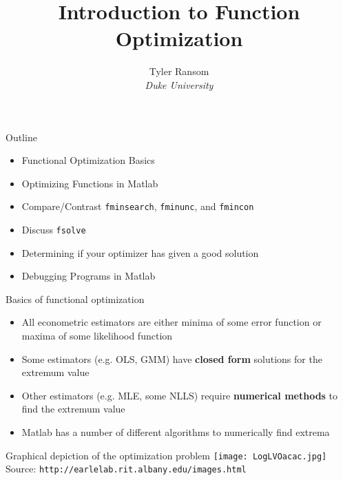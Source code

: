 \documentclass[english,xcolor=dvipsnames]{beamer}
\begin{document}
\begin{frame}
\title{Introduction to Function Optimization}
\author{
	Tyler Ransom\\
	\emph{Duke University}\\
}
\titlepage
\end{frame}

\begin{frame}{Outline}
\begin{itemize}
	\item Functional Optimization Basics
	\item Optimizing Functions in Matlab
	\item Compare/Contrast \texttt{fminsearch}, \texttt{fminunc}, and \texttt{fmincon}
	\item Discuss \texttt{fsolve}
	\item Determining if your optimizer has given a good solution
	\item Debugging Programs in Matlab
\end{itemize}
\end{frame}

\begin{frame}{Basics of functional optimization}
	\begin{itemize}
		\item All econometric estimators are either minima of some error function or maxima of some likelihood function
		\item Some estimators (e.g. OLS, GMM) have \textbf{closed form} solutions for the extremum value
		\item Other estimators (e.g. MLE, some NLLS) require \textbf{numerical methods} to find the extremum value
		\item Matlab has a number of different algorithms to numerically find extrema
	\end{itemize}
\end{frame}

\begin{frame}{Graphical depiction of the optimization problem}
\centering
\texttt{[image: LogLVOacac.jpg]}\\
\scriptsize{Source: \texttt{http://earlelab.rit.albany.edu/images.html}}
\end{frame}
\end{document}
